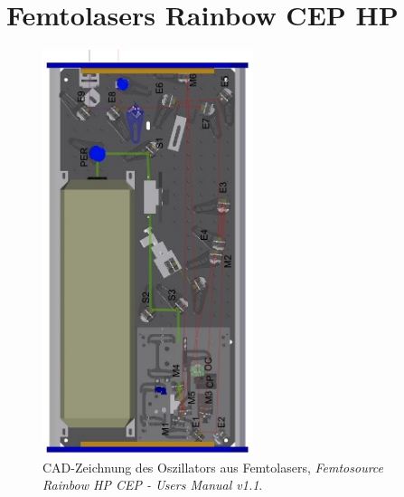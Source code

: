 \documentclass[bachelor,       %
               twoside,        %
               BCOR10mm,       %
               liststotoc,nomtotoc,bibtotoc, %
               english,ngerman, %
               final,          %
               ]{GAUBM}
\begin{document}
\chapter{Femtolasers Rainbow CEP HP}
\begin{figure}[!htb]
	\centering
	\includegraphics[width=0.55\textwidth]{figures/RainbowSetupManual.png}
	\caption{CAD-Zeichnung des Oszillators aus Femtolasers, \textit{Femtosource Rainbow HP CEP - Users Manual v1.1}.}
\end{figure}
%
%

\cleardoublepage

\end{document}
